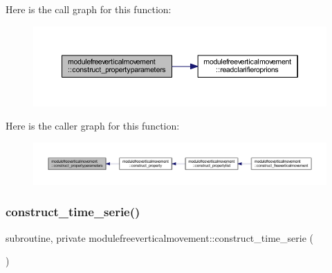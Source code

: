 Here is the call graph for this function\+:\nopagebreak
\begin{figure}[H]
\begin{center}
\leavevmode
\includegraphics[width=350pt]{namespacemodulefreeverticalmovement_a5899cd9d999076fff990bfecf3b374a7_cgraph}
\end{center}
\end{figure}
Here is the caller graph for this function\+:\nopagebreak
\begin{figure}[H]
\begin{center}
\leavevmode
\includegraphics[width=350pt]{namespacemodulefreeverticalmovement_a5899cd9d999076fff990bfecf3b374a7_icgraph}
\end{center}
\end{figure}
\mbox{\label{namespacemodulefreeverticalmovement_a2ca295c9f72cbcb4ce9b0d893235eca0}} 
\subsubsection{\texorpdfstring{construct\+\_\+time\+\_\+serie()}{construct\_time\_serie()}}
{\footnotesize\ttfamily subroutine, private modulefreeverticalmovement\+::construct\+\_\+time\+\_\+serie (\begin{DoxyParamCaption}{ }\end{DoxyParamCaption})\hspace{0.3cm}{\ttfamily [private]}}

